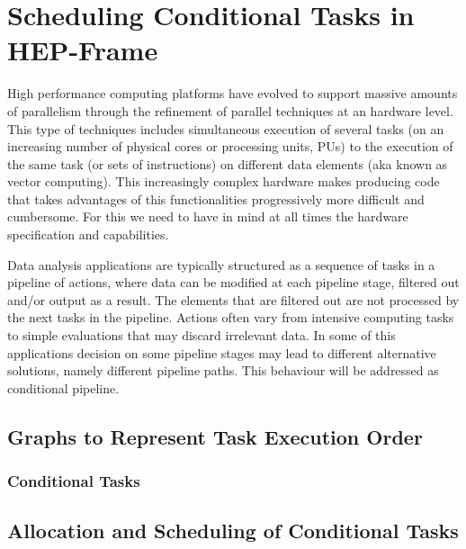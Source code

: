 \chapter{Scheduling Conditional Tasks in HEP-Frame}

 
 High performance computing platforms have evolved to  support massive amounts of parallelism through the refinement of parallel techniques at an hardware level. This type of techniques includes simultaneous execution of several tasks (on an increasing number of physical cores or processing units, PUs) to the execution of the same task (or sets of instructions) on different data elements (aka known as vector computing). 
 This increasingly complex hardware makes producing code that takes advantages of this functionalities progressively more difficult and cumbersome. For this we need to have in mind at all times the hardware specification and capabilities. 
 

Data analysis applications are typically structured as a sequence of tasks in a pipeline of actions, where data can be modified at each pipeline stage, filtered out and/or output as a result.
The elements that are filtered out are not processed by the next tasks in the pipeline. 
Actions often vary from intensive computing tasks to simple evaluations that may discard irrelevant data. 
In some of this applications decision on some pipeline stages may lead to different alternative solutions, namely different pipeline paths. 
This behaviour will be addressed as conditional pipeline. 
 
\section{Graphs to Represent Task Execution Order}

\subsection{Conditional Tasks}

\section{Allocation and Scheduling of Conditional Tasks}

